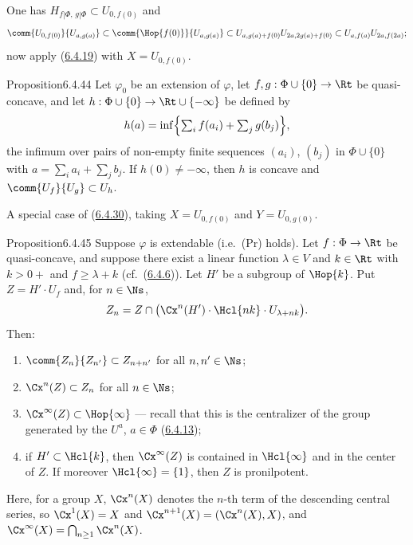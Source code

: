 \documentclass[12pt,a4paper,oneside,english]{smfart}
\makeatletter
\newcommand{\btanchor}[1]{\leavevmode\Hy@raisedlink{\hypertarget{bt:#1}{}}}
\newcommand{\btref}[1]{\hyperlink{bt:#1}{#1}}
\theoremstyle{definition}
\theoremstyle{bt}
\makeatother
\begin{document}
\begin{sketch}
One has $H_{f|\Phi,\,g|\Phi}\subset U_{0,f(0)}$ and
\[
  \comm{U_{0,f(0)}}{U_{a,g(a)}}\subset
  \comm{\Hop{f(0)}}{U_{a,g(a)}}\subset
  U_{a,g(a)+f(0)}U_{2a,2g(a)+f(0)}\subset U_{a,f(a)}U_{2a,f(2a)};
\]
now apply (\btref{6.4.19}) with $X=U_{0,f(0)}$.
\end{sketch}

\begin{bt}{Proposition}{6.4.44}\btanchor{6.4.44}
Let $\varphi_0$ be an extension of $\varphi$, let
$f,g:\Phi\cup\{0\}\to\Rt$ be quasi-concave, and let
$h:\Phi\cup\{0\}\to\Rt\cup\{-\infty\}$ be defined by
\[
  h(a)=\inf\Bigl\{\textstyle\sum_i f(a_i)+\sum_j g(b_j)\Bigr\},
\]
the infimum over pairs of non-empty finite sequences $(a_i)$, $(b_j)$ in
$\Phi\cup\{0\}$ with $a=\sum_i a_i+\sum_j b_j$. If $h(0)\ne-\infty$,
then $h$ is concave and $\comm{U_f}{U_g}\subset U_h$.
\end{bt}

\begin{sketch}
A special case of (\btref{6.4.30}), taking $X=U_{0,f(0)}$ and $Y=U_{0,g(0)}$.
\end{sketch}

\begin{bt}{Proposition}{6.4.45}\btanchor{6.4.45}
Suppose $\varphi$ is extendable (i.e.\ (Pr) holds). Let $f:\Phi\to\Rt$
be quasi-concave, and suppose there exist a linear function
$\lambda\in V$ and $k\in\Rt$ with $k>0+$ and $f\ge\lambda+k$
(cf.\ (\btref{6.4.6})). Let $H'$ be a subgroup of $\Hop{k}$. Put $Z=H'\cdot U_f$
and, for $n\in\Ns$,
\[
  Z_n=Z\cap\bigl(\Cx^{n}(H')\cdot \Hcl{nk}\cdot U_{\lambda+nk}\bigr).
\]
Then:
\begin{enumerate}
\item[(1)] $\comm{Z_n}{Z_{n'}}\subset Z_{n+n'}$ for all $n,n'\in\Ns$;
\item[(2)] $\Cx^{n}(Z)\subset Z_n$ for all $n\in\Ns$;
\item[(3)] $\Cx^{\infty}(Z)\subset \Hop{\infty}$ --- recall that this is
  the centralizer of the group generated by the $U^{a}$, $a\in\Phi$
  (\btref{6.4.13});
\item[(4)] if $H'\subset \Hcl{k}$, then $\Cx^{\infty}(Z)$ is contained in
  $\Hcl{\infty}$ and in the center of $Z$. If moreover
  $\Hcl{\infty}=\{1\}$, then $Z$ is pronilpotent.
\end{enumerate}
\end{bt}

\noindent
Here, for a group $X$, $\Cx^{n}(X)$ denotes the $n$-th term of the
descending central series, so $\Cx^{1}(X)=X$ and
$\Cx^{n+1}(X)=(\Cx^{n}(X),X)$, and
$\Cx^{\infty}(X)=\bigcap_{n\ge1}\Cx^{n}(X)$.
\end{document}
